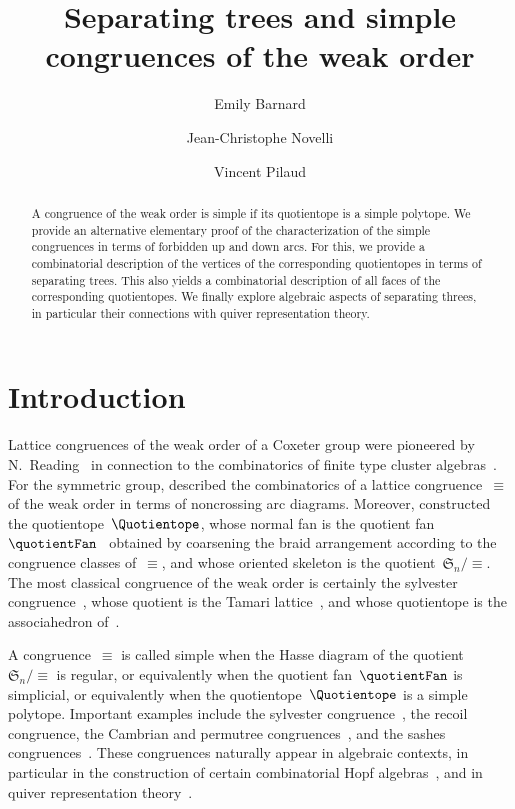 \documentclass{amsart}
\title[Separating trees and simple comgruences]{Separating trees and simple congruences of the weak order}
\author{Emily Barnard}
\author{Jean-Christophe Novelli}
\author{Vincent Pilaud}
\theoremstyle{definition}
\newcommand{\f}[1]{{\mathfrak{#1}}} %
\begin{document}
\begin{abstract}
A congruence of the weak order is simple if its quotientope is a simple polytope.
We provide an alternative elementary proof of the characterization of the simple congruences in terms of forbidden up and down arcs.
For this, we provide a combinatorial description of the vertices of the corresponding quotientopes in terms of separating trees.
This also yields a combinatorial description of all faces of the corresponding quotientopes.
We finally explore algebraic aspects of separating threes, in particular their connections with quiver representation theory.
\end{abstract}

\maketitle

\tableofcontents

\pagebreak


\section{Introduction}
\label{sec:introduction}

Lattice congruences of the weak order of a Coxeter group were pioneered by N.~Reading~\cite{Reading-CambrianLattices} in connection to the combinatorics of finite type cluster algebras~\cite{FominZelevinsky-ClusterAlgebrasI,FominZelevinsky-ClusterAlgebrasII}.
For the symmetric group, \cite{Reading-arcDiagrams} described the combinatorics of a lattice congruence~$\equiv$ of the weak order in terms of noncrossing arc diagrams.
Moreover, \cite{PilaudSantos-quotientopes, PadrolPilaudRitter} constructed the quotientope~$\Quotientope$, whose normal fan is the quotient fan~$\quotientFan$~\cite{Reading-HopfAlgebras} obtained by coarsening the braid arrangement according to the congruence classes of~$\equiv$, and whose oriented skeleton is the quotient~$\f{S}_n/{\equiv}$.
The most classical congruence of the weak order is certainly the sylvester congruence~\cite{Tonks, HivertNovelliThibon-algebraBinarySearchTrees}, whose quotient is the Tamari lattice~\cite{Tamari}, and whose quotientope is the associahedron of~\cite{ShniderSternberg, Loday}.

A congruence~$\equiv$ is called simple when the Hasse diagram of the quotient~$\f{S}_n/{\equiv}$ is regular, or equivalently when the quotient fan~$\quotientFan$ is simplicial, or equivalently when the quotientope~$\Quotientope$ is a simple polytope.
Important examples include the sylvester congruence~\cite{Tonks, HivertNovelliThibon-algebraBinarySearchTrees}, the recoil congruence, the Cambrian and permutree congruences~\cite{Reading-CambrianLattices, PilaudPons-permutrees}, and the sashes congruences~\cite{Law,LaniniNovelli}.
These congruences naturally appear in algebraic contexts, in particular in the construction of certain combinatorial Hopf algebras~\cite{LodayRonco, HivertNovelliThibon-algebraBinarySearchTrees, ChatelPilaud, PilaudPons-permutrees}, and in quiver representation theory~\cite{DemonetIyamaReadingReitenThomas}.
\end{document}
